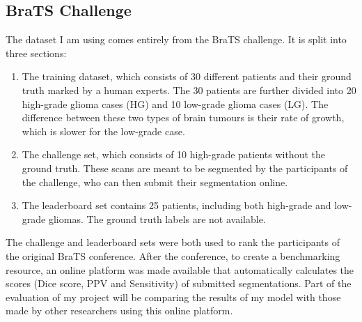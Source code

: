 \documentclass[12pt,a4paper,twoside,openright]{report}
\begin{document}
\subsection{BraTS Challenge}
The dataset I am using comes entirely from the BraTS \cite{menze:hal-00935640} challenge. It is split into three sections:
\begin{enumerate}
	\item The training dataset, which consists of 30 different patients and their ground truth marked by a human experts. The 30 patients are further divided into 20 high-grade glioma cases (HG) and 10 low-grade glioma cases (LG). The difference between these two types of brain tumours is their rate  of growth, which is slower for the low-grade case.
	\item The challenge set, which consists of 10 high-grade patients without the ground truth. These scans are meant to be segmented by the participants of the challenge, who can then submit their segmentation online. 	
	\item The leaderboard set contains 25 patients, including both high-grade and low-grade gliomas. The ground truth labels are not available.
\end{enumerate}
The challenge and leaderboard sets were both used to rank the participants of the original BraTS conference. After the conference, to create a benchmarking resource, an online platform was made available that automatically calculates the scores (Dice score, PPV and Sensitivity) of submitted segmentations. Part of the evaluation of my project will be comparing the results of my model with those made by other researchers using this online platform.
\end{document}
